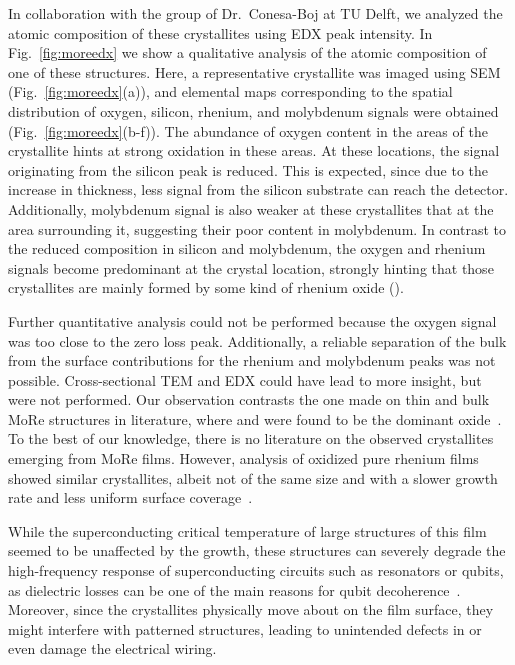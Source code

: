 In collaboration with the group of Dr.~Conesa-Boj at TU Delft, we analyzed the atomic composition of these crystallites using EDX peak intensity.
In Fig.~\ref{fig:moreedx} we show a qualitative analysis of the atomic composition of one of these structures.
%
Here, a representative crystallite was imaged using SEM (Fig.~\ref{fig:moreedx}(a)), and elemental maps corresponding to the spatial distribution of oxygen, silicon, rhenium, and molybdenum signals were obtained (Fig.~\ref{fig:moreedx}(b-f)).
%
The abundance of oxygen content in the areas of the crystallite hints at strong oxidation in these areas.
%
At these locations, the signal originating from the silicon peak is reduced.
%
This is expected, since due to the increase in thickness, less signal from the silicon substrate can reach the detector.
%
Additionally, molybdenum signal is also weaker at these crystallites that at the area surrounding it, suggesting their poor content in molybdenum. 
%
In contrast to the reduced composition in silicon and molybdenum, the oxygen and rhenium signals become predominant at the crystal location, strongly hinting that those crystallites are mainly formed by some kind of rhenium oxide ().

Further quantitative analysis could not be performed because the oxygen signal was too close to the zero loss peak.
%
Additionally, a reliable separation of the bulk from the surface contributions for the rhenium and molybdenum peaks was not possible.
%
Cross-sectional TEM and EDX could have lead to more insight, but were not performed.
%
Our observation contrasts the one made on thin and bulk MoRe structures in literature, where  and  were found to be the dominant oxide~\cite{seleznevDepositionCharacterizationFewnanometersthick2008b,gotzCosputteredMoReThin2016}.
%
To the best of our knowledge, there is no literature on the observed  crystallites emerging from MoRe films.
%
However, analysis of oxidized pure rhenium films showed similar crystallites, albeit not of the same size and with a slower growth rate and less uniform surface coverage~\cite{mannionAmbientAgingRhenium2017,mannionRheniumFilamentOxidation2017}.


While the superconducting critical temperature of large structures of this film seemed to be unaffected by the growth, these structures can severely degrade the high-frequency response of superconducting circuits such as resonators or qubits, as dielectric losses can be one of the main reasons for qubit decoherence~\cite{lisenfeldElectricFieldSpectroscopy2019}.
%
Moreover, since the crystallites physically move about on the film surface, they might interfere with patterned structures, leading to unintended defects in or even damage the electrical wiring.


